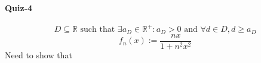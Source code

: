 \documentclass[20pt]{extarticle} %
\begin{document}
\paragraph{Quiz-4}

\[D \subseteq \mathbb{R} \text{ such that } \exists a_D \in \mathbb{R^+}: a_D >0 \text{ and }  \forall d \in D, d \geq a_D    \]
\[  f_n(x):= \frac{nx}{1+n^2x^2}   \]
Need to show that
\end{document}
